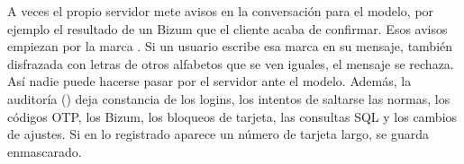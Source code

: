 A veces el propio servidor mete avisos en la conversación para el modelo, por ejemplo el resultado de un Bizum que
el cliente acaba de confirmar. Esos avisos empiezan por la marca \cod{[auto]}. Si un usuario escribe esa marca en su
mensaje, también disfrazada con letras de otros alfabetos que se ven iguales, el mensaje se rechaza. Así nadie puede
hacerse pasar por el servidor ante el modelo. Además, la auditoría () deja
constancia de los logins, los intentos de saltarse las normas, los códigos OTP, los Bizum, los bloqueos de tarjeta,
las consultas SQL y los cambios de ajustes. Si en lo registrado aparece un número de tarjeta largo, se guarda
enmascarado.
